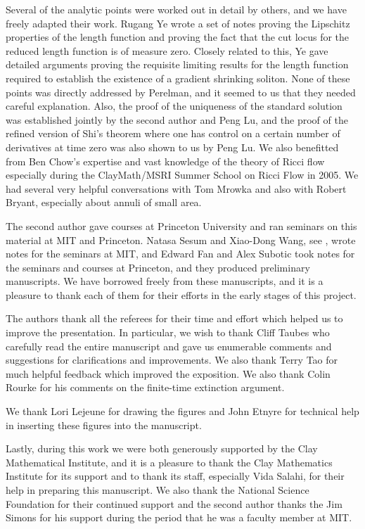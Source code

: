 Several of the analytic points were worked out in detail by others,
and we have freely adapted their work. Rugang Ye wrote a set of
notes proving the Lipschitz properties of the length function and
proving the fact that the cut locus for the reduced length function
is of measure zero. Closely related to this, Ye gave detailed
arguments proving the requisite limiting results for the length
function required to establish the existence of a gradient shrinking
soliton. None of these points was directly addressed by Perelman,
and it seemed to us that they needed careful explanation. Also, the
proof of the uniqueness of the standard solution was established
jointly by the second author and Peng Lu, and the proof of the
refined version of Shi's theorem where one has control on a certain
number of derivatives at time zero was also shown to us by Peng Lu.
We also benefitted from Ben Chow's expertise and vast knowledge of
the theory of Ricci flow especially during the ClayMath/MSRI Summer
School on Ricci Flow in 2005. We had several very helpful
conversations with Tom Mrowka and also with Robert Bryant,
especially about annuli of small area.


The second author gave courses at Princeton University and ran
seminars on this material at MIT and Princeton. Natasa Sesum and
Xiao-Dong Wang, see \cite{STW}, wrote notes for the seminars at MIT,
and Edward Fan and Alex Subotic took notes for the seminars and
courses at Princeton, and they produced preliminary manuscripts. We
have borrowed freely from these manuscripts, and it is a pleasure to
thank each of them for their efforts in the early stages of this
project.

The authors thank all the referees for their time and effort which
helped us to improve the presentation. In particular, we wish to
thank Cliff Taubes who carefully read the entire manuscript and gave
us enumerable comments and suggestions for clarifications and
improvements. We also thank Terry Tao for much helpful feedback
which improved the exposition. We also thank Colin Rourke for his
comments on the finite-time extinction argument.


We thank Lori Lejeune for drawing the figures and John Etnyre for technical
help in inserting these figures into the manuscript.

Lastly, during this work we were both generously supported by the Clay
Mathematical Institute, and it is a pleasure to thank the Clay Mathematics
Institute for its support and to thank its staff, especially Vida Salahi, for
their help in preparing this manuscript. We also thank the National Science Foundation
for their continued support and the second author thanks the Jim Simons
for his support during the period that he was a faculty member at MIT.

